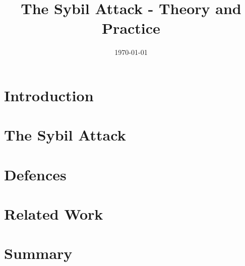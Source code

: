 \documentclass[12pt]{article}
\title{The Sybil Attack - Theory and Practice}
\date{\today}
\begin{document}
\maketitle
\begin{abstract}
\end{abstract}

\section{Introduction}


% 

\section{The Sybil Attack}\label{sec:sybil}


\section{Defences}\label{sec:defences}


\section{Related Work}\label{sec:related}


\section{Summary}

\printbibliography
\end{document}
